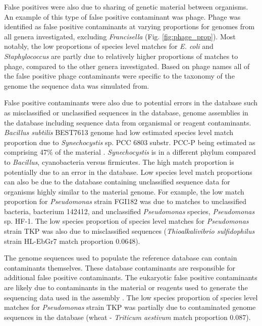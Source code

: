 \documentclass[fleqn,10pt,lineno]{wlpeerj}\usepackage[]{graphicx}\usepackage[]{color}
\begin{document}
False positives were also due to sharing of genetic material between organisms. An example of this type of false positive contaminant was phage. 
Phage was identified as false positive contaminants at varying proportions for genomes from all genera investigated, excluding \textit{Francisella} (Fig. \ref{fig:phage_prop}). 
Most notably, the low proportions of species level matches for \textit{E. coli} and \textit{Staphylococcus} are partly due to relatively higher proportions of matches to phage, compared to the other genera investigated. 
Based on phage names all of the false positive phage contaminants were specific to the taxonomy of the genome the sequence data was simulated from. 

False positive contaminants were also due to potential errors in the database such as misclassified or unclassified sequences in the database, genome assemblies in the database including sequence data from organismal or reagent contaminants. 
\textit{Bacillus subtilis} BEST7613 genome had low estimated species level match proportion due to \textit{Synechocystis} sp. PCC 6803 substr. PCC-P being estimated as comprising 47\% of the material  \citep{kanesaki2012identification}. \textit{Synechocystis} is in a different phylum compared to \textit{Bacillus}, cyanobacteria versus firmicutes. 
The high match proportion is potentially due to an error in the database. 
Low species level match proportions can also be due to the database containing unclassified sequence data for organisms highly similar to the material genome. 
For example, the low match proportion for \textit{Pseudomonas} strain FGI182 was due to matches to unclassified bacteria, bacterium 142412, and unclassified \textit{Pseudomonas} species, \textit{Pseudomonas} sp. HF-1. 
The low species proportion of species level matches for \textit{Pseudomonas} strain TKP was also due to misclassified sequences (\textit{Thioalkalivibrio sulfidophilus} strain HL-EbGr7 match proportion 0.0648).

The genome sequences used to populate the reference database can contain contaminants themselves. 
These database contaminants are responsible for additional false positive contaminants.
The eukaryotic false positive contaminants are likely due to contaminants in the material or reagents used to generate the sequencing data used in the assembly \citep{parks2015checkm}. 
The low species proportion of species level matches for \textit{Pseudomonas} strain TKP was partially due to contaminated genome sequences in the database (wheat - \textit{Triticum aestivum} match proportion 0.087). 
\end{document}

